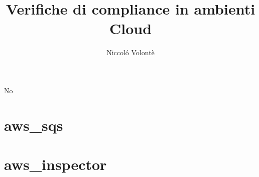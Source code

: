 \documentclass[twoside,12pt]{report}
\title{Verifiche di compliance in ambienti Cloud}
\author{Niccoló Volontè}
\begin{document}
    
    \makecenteredfrontpage
    
    
    	
    	
    	
    
    
    
    
    
    No
    
    
    \afterpreface
    
    
    
    
    

    
    
    
    
    
    
    
    \appendix
    \chapter{aws\_sqs}
    \label{app:sqs}
    
    
    \chapter{aws\_inspector}
    \label{app:inspector}
    
\end{document}
